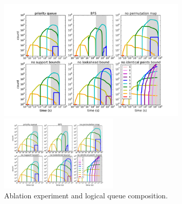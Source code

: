 \begin{figure}[t!]
\begin{center}
\begin{arxiv}
\includegraphics[width=0.8\textwidth]{figs/ela_compas_compare-queue.pdf}
\end{arxiv}
\begin{kdd}
\includegraphics[trim={30mm 10mm 20mm 10mm}, width=0.5\textwidth]{figs/ela_compas_compare-queue.pdf}
\end{kdd}
\end{center}
\caption{Ablation experiment and logical queue composition.
}
\label{fig:queue}
\end{figure}


